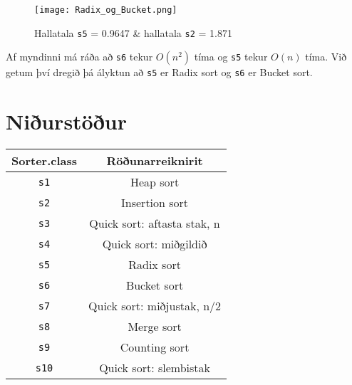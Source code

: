 \documentclass[a4paper,oneside]{article}
\begin{document}
\begin{figure}[h!]
    \centering
    \texttt{[image: Radix\_og\_Bucket.png]}
    \caption{Hallatala \texttt{s5} = 0.9647 \& hallatala \texttt{s2} = 1.871}
\end{figure}

\noindent Af myndinni má ráða að \texttt{s6} tekur $O(n^2)$ tíma og \texttt{s5} tekur $O(n)$ tíma.
Við getum því dregið þá ályktun að \texttt{s5} er Radix sort og \texttt{s6} er Bucket sort.

\section{Niðurstöður}
\begin{tabular}{ c | c }
    Sorter.class & Röðunarreiknirit \\ \hline
    \texttt{s1}  & Heap sort \\
    \texttt{s2}  & Insertion sort \\
    \texttt{s3}  & Quick sort: aftasta stak, n \\
    \texttt{s4}  & Quick sort: miðgildið \\
    \texttt{s5}  & Radix sort \\
    \texttt{s6}  & Bucket sort \\
    \texttt{s7}  & Quick sort: miðjustak, n/2 \\
    \texttt{s8}  & Merge sort \\
    \texttt{s9}  & Counting sort \\
    \texttt{s10} & Quick sort: slembistak \\ \hline
\end{tabular}
\end{document}
